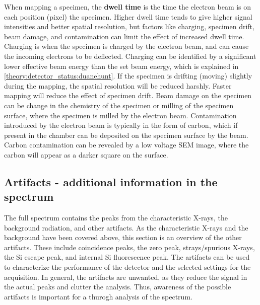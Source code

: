 When mapping a specimen, the \textbf{dwell time} is the time the electron beam is on each position (pixel) the specimen.
Higher dwell time tends to give higher signal intensities and better spatial resolution, but factors like charging, specimen drift, beam damage, and contamination can limit the effect of increased dwell time.
Charging is when the specimen is charged by the electron beam, and can cause the incoming electrons to be deflected.
Charging can be identified by a significant lower effective beam energy than the set beam energy, which is explained in \cref{theory:detector_status:duanehunt}.
If the specimen is drifting (moving) slightly during the mapping, the spatial resolution will be reduced harshly.
Faster mapping will reduce the effect of specimen drift.
Beam damage on the specimen can be change in the chemistry of the specimen or milling of the specimen surface, where the specimen is milled by the electron beam.
Contamination introduced by the electron beam is typically in the form of carbon, which if present in the chamber can be deposited on the specimen surface by the beam.
Carbon contamination can be revealed by a low voltage SEM image, where the carbon will appear as a darker square on the surface.






\clearpage


\subsection{Artifacts - additional information in the spectrum}
\label{theory:eds:artifacts}



The full spectrum contains the peaks from the characteristic X-rays, the background radiation, and other artifacts.
As the characteristic X-rays and the background have been covered above, this section is an overview of the other artifacts.
These include coincidence peaks, the zero peak, strays/spurious X-rays, the Si escape peak, and internal Si fluorescence peak.
The artifacts can be used to characterize the performance of the detector and the selected settings for the acquisition.
In general, the artifacts are unwanted, as they reduce the signal in the actual peaks and clutter the analysis.
Thus, awareness of the possible artifacts is important for a thurogh analysis of the spectrum.


